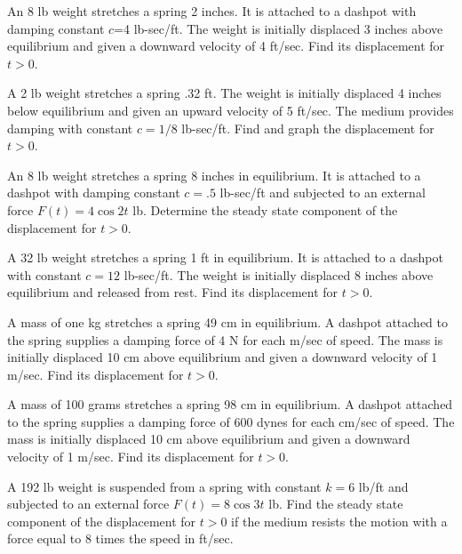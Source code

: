 \documentclass{ximera}
\begin{document}
\begin{problem}\label{exer:6.2.11}
An 8 lb weight stretches a spring 2 inches. It is attached to a
dashpot with damping constant $c$=4 lb-sec/ft. The weight is
initially displaced 3 inches above equilibrium and given a downward
velocity of 4 ft/sec. Find its displacement for $t>0$.
\end{problem}

\begin{problem}\label{exer:6.2.12}  
A 2 lb weight stretches a spring .32 ft. The weight is initially
displaced 4 inches below equilibrium and given an upward velocity of 5
ft/sec. The medium provides damping with constant $c=1/8$ lb-sec/ft.
Find and graph the displacement for $t>0$.
\end{problem}

\begin{problem}\label{exer:6.2.13}
  An 8 lb weight stretches a spring 8 inches in equilibrium.
It is attached to a dashpot with damping constant $c=.5$ lb-sec/ft
and subjected to an external force  $F(t)=4\cos2t$ lb.
Determine the steady state component of the displacement for $t>0$.
\end{problem}

\begin{problem}\label{exer:6.2.14}
A 32 lb weight stretches a spring 1 ft in equilibrium. It is attached
to a dashpot with constant $c=12$ lb-sec/ft. The weight is initially
displaced 8 inches above equilibrium and released from rest. Find its
displacement for $t>0$.
\end{problem}

\begin{problem}\label{exer:6.2.15}
A mass of one kg stretches a spring 49 cm in equilibrium. A dashpot
attached to the spring supplies a damping force of 4 N for each m/sec
of speed. The mass is initially displaced 10 cm above equilibrium and
given a downward velocity of 1 m/sec. Find its displacement for $t>0$.
\end{problem}

\begin{problem}\label{exer:6.2.16}
A mass of 100 grams stretches a spring 98 cm in equilibrium. A dashpot
attached to the spring supplies a damping force of 600 dynes for each
cm/sec of speed. The mass is initially displaced 10 cm above
equilibrium and given a downward velocity of 1 m/sec. Find its
displacement for $t>0$.
\end{problem}

\begin{problem}\label{exer:6.2.17}
A 192 lb weight is suspended from a spring with constant $k=6$ lb/ft
and subjected to an external force $F(t)=8\cos3t$ lb. Find the steady
state component of the displacement for $t>0$ if the medium resists
the motion with a force  equal to 8 times the speed in
ft/sec.
\end{problem}
\end{document}
